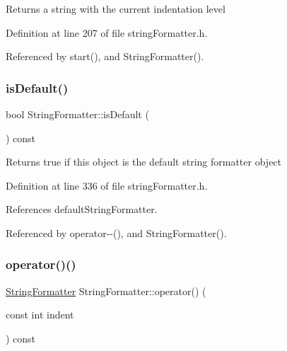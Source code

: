\begin{DoxyReturn}{Returns}
a string with the current indentation level 
\end{DoxyReturn}


Definition at line 207 of file string\+Formatter.\+h.



Referenced by start(), and String\+Formatter().

\mbox{\label{classStringFormatter_ad5c79478047b44b242bcd5e3b64df3b6}} 
\subsubsection{\texorpdfstring{is\+Default()}{isDefault()}}
{\footnotesize\ttfamily bool String\+Formatter\+::is\+Default (\begin{DoxyParamCaption}{ }\end{DoxyParamCaption}) const}

\begin{DoxyReturn}{Returns}
true if this object is the default string formatter object 
\end{DoxyReturn}


Definition at line 336 of file string\+Formatter.\+h.



References default\+String\+Formatter.



Referenced by operator-\/-\/(), and String\+Formatter().

\mbox{\label{classStringFormatter_aa60790b08f6f3c4a1cbf5e3dec0a8895}} 
\subsubsection{\texorpdfstring{operator()()}{operator()()}}
{\footnotesize\ttfamily \hyperlink{classStringFormatter}{String\+Formatter} String\+Formatter\+::operator() (\begin{DoxyParamCaption}\item[{const int}]{indent }\end{DoxyParamCaption}) const\hspace{0.3cm}{\ttfamily [inline]}}


